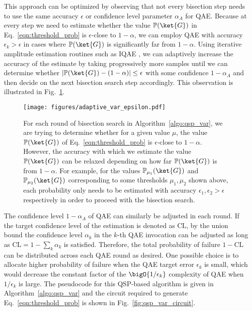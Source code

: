 \begin{enumerate}
This approach can be optimized by observing that not every bisection step needs to use the same accuracy $\epsilon$ or confidence level parameter $\alpha_{A}$ for QAE.
Because at every step we need to estimate whether the value $\mathbb{P}(\ket{G})$ in Eq.~\eqref{eqn:threshold_prob} is $\epsilon$-close to $1-\alpha$, we can employ QAE with accuracy $\epsilon_k > \epsilon$ in cases where $\mathbb{P}(\ket{G})$ is significantly far from $1-\alpha$.
Using iterative amplitude estimation routines such as IQAE \cite{grinko2021iterative}, we can adaptively increase the accuracy of the estimate by taking progressively more samples until we can determine whether $|\mathbb{P}(\ket{G}) - (1 -\alpha)| \le \epsilon$ with some confidence $1-\alpha_{A}$ and then decide on the next bisection search step accordingly.
This observation is illustrated in Fig.~\ref{fig:adaptive_var_epsilon}.
\begin{figure}[h]
  \centering
  \texttt{[image: figures/adaptive\_var\_epsilon.pdf]}
  \caption{For each round of  bisection search in Algorithm~\ref{algo:qsp_var}, we are trying to determine whether for a given value $\mu$, the value $\mathbb{P}(\ket{G})$ of Eq.~\eqref{eqn:threshold_prob} is $\epsilon$-close to $1-\alpha$. However, the accuracy with which we estimate the value $\mathbb{P}(\ket{G})$ can be relaxed depending on how far $\mathbb{P}(\ket{G})$ is from $1-\alpha$. For example, for the values $\mathbb{P}_{\mu_1}(\ket{G})$ and $\mathbb{P}_{\mu_2}(\ket{G})$ corresponding to some thresholds $\mu_1, \mu_2$ shown above, each probability only needs to be estimated with accuracy $\epsilon_1, \epsilon_2 > \epsilon$ respectively in order to proceed with the bisection search.}
  \label{fig:adaptive_var_epsilon}
\end{figure}

The confidence level $1-\alpha_{A}$ of QAE can similarly be adjusted in each round.
If the target confidence level of the \var{} estimation is denoted as $\textrm{CL}$, by the union bound the confidence level $\alpha_k$ in the $k$-th QAE invocation can be adjusted as long as $\textrm{CL} = 1- \sum_{k}\alpha_k$ is satisfied.
Therefore, the total probability of failure $1-\textrm{CL}$ can be distributed across each QAE round as desired.
One possible choice is to allocate higher probability of failure when the QAE target error $\epsilon_k$ is small, which would decrease the constant factor of the $\bigO{1/{\epsilon_k}}$ complexity of QAE when $1/{\epsilon_k}$ is large.
The pseudocode for this QSP-based algorithm is given in Algorithm~\ref{algo:qsp_var} and the circuit required to generate Eq.~\eqref{eqn:threshold_prob} is shown in Fig.~\ref{fig:qsp_var_circuit}.



\end{enumerate}
